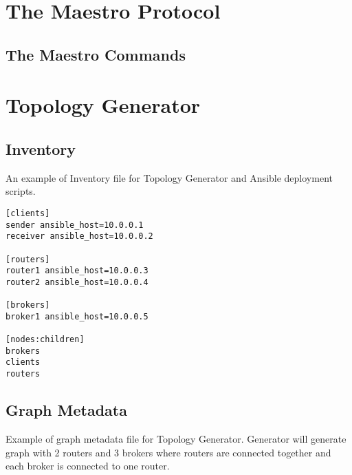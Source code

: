 

\chapter{The Maestro Protocol}

\section{The Maestro Commands}
\label{AP:commands}

\chapter{Topology Generator} %

\section{Inventory}
\label{AP:Inventory}
An example of Inventory file for Topology Generator and Ansible deployment scripts.

\begin{verbatim}
[clients]
sender ansible_host=10.0.0.1					
receiver ansible_host=10.0.0.2

[routers]
router1 ansible_host=10.0.0.3
router2 ansible_host=10.0.0.4

[brokers]
broker1 ansible_host=10.0.0.5

[nodes:children]
brokers
clients
routers
\end{verbatim}

\section{Graph Metadata}
\label{AP:Graph Metadata}
Example of graph metadata file for Topology Generator. Generator will generate graph with 2 routers and 3 brokers where routers are connected together and each broker is connected to one router.

